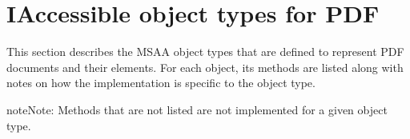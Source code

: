 \documentclass[letterpaper,12pt,english,openany,oneside]{sphinxmanual}
\begin{document}

\begin{sphinxVerbatim}[commandchars=\\\{\}]
\end{sphinxVerbatim}




\section{IAccessible object types for PDF}
\label{\detokenize{MSAA_PDF:iaccessible-object-types-for-pdf}}
This section describes the MSAA  object types that are defined to represent PDF documents and their elements. For each object, its methods are listed along with notes on how the implementation is specific to the object type.

\begin{sphinxadmonition}{note}{Note:}
Methods that are not listed are not implemented for a given object type.
\end{sphinxadmonition}
\end{document}
